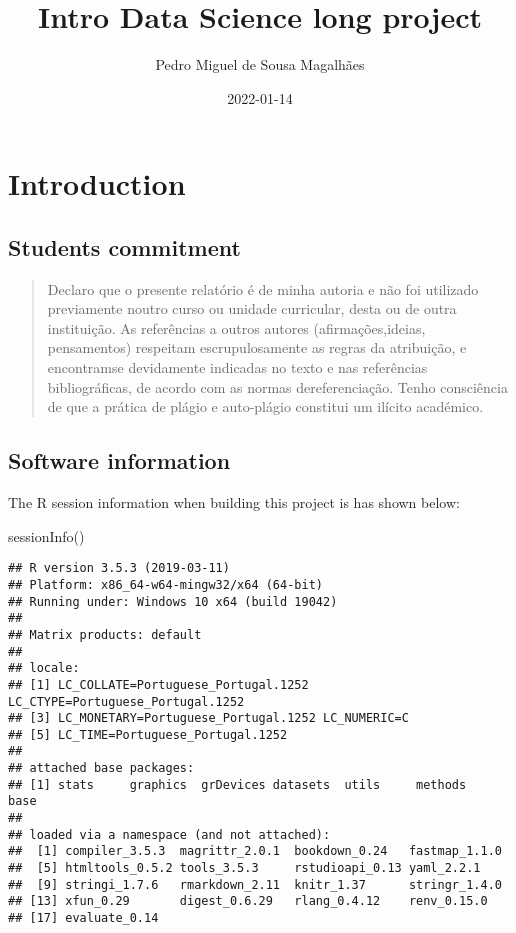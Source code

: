 \documentclass[
]{book}
\title{Intro Data Science long project}
\author{Pedro Miguel de Sousa Magalhães}
\date{2022-01-14}
\newenvironment{Shaded}{\begin{snugshade}}{\end{snugshade}}
\newcommand{\FunctionTok}[1]{\textcolor[rgb]{0.00,0.00,0.00}{#1}}
\newcommand{\NormalTok}[1]{#1}
\begin{document}
\maketitle

{
\setcounter{tocdepth}{1}
\tableofcontents
}
\hypertarget{introduction}{%
\chapter{Introduction}\label{introduction}}

\hypertarget{students-commitment}{%
\section{Students commitment}\label{students-commitment}}

\begin{quote}
Declaro que o presente relatório é de minha autoria e não foi utilizado previamente noutro curso ou unidade curricular, desta ou de outra instituição. As referências a outros autores (afirmações,ideias, pensamentos) respeitam escrupulosamente as regras da atribuição, e encontramse devidamente indicadas no texto e nas referências bibliográficas, de acordo com as normas dereferenciação. Tenho consciência de que a prática de plágio e auto-plágio constitui um ilícito académico.
\end{quote}

\hypertarget{software-information}{%
\section{Software information}\label{software-information}}

The R session information when building this project is has shown below:

\begin{Shaded}
\begin{Highlighting}[]
\FunctionTok{sessionInfo}\NormalTok{()}
\end{Highlighting}
\end{Shaded}

\begin{verbatim}
## R version 3.5.3 (2019-03-11)
## Platform: x86_64-w64-mingw32/x64 (64-bit)
## Running under: Windows 10 x64 (build 19042)
## 
## Matrix products: default
## 
## locale:
## [1] LC_COLLATE=Portuguese_Portugal.1252  LC_CTYPE=Portuguese_Portugal.1252   
## [3] LC_MONETARY=Portuguese_Portugal.1252 LC_NUMERIC=C                        
## [5] LC_TIME=Portuguese_Portugal.1252    
## 
## attached base packages:
## [1] stats     graphics  grDevices datasets  utils     methods   base     
## 
## loaded via a namespace (and not attached):
##  [1] compiler_3.5.3  magrittr_2.0.1  bookdown_0.24   fastmap_1.1.0  
##  [5] htmltools_0.5.2 tools_3.5.3     rstudioapi_0.13 yaml_2.2.1     
##  [9] stringi_1.7.6   rmarkdown_2.11  knitr_1.37      stringr_1.4.0  
## [13] xfun_0.29       digest_0.6.29   rlang_0.4.12    renv_0.15.0    
## [17] evaluate_0.14
\end{verbatim}
\end{document}
